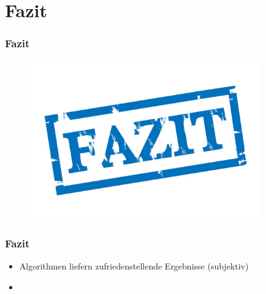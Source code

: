 \documentclass[12pt]{beamer}
\begin{document}
    \section{Fazit}
    \label{sec:fazit}
    \begin{frame}
        \frametitle{Fazit}

        \begin{figure}
            \centering
            \includegraphics[width=10cm]{../images/fazit.jpg}
        \end{figure}
    \end{frame}

    \begin{frame}
        \frametitle{Fazit}

        \begin{itemize}
            \setlength\itemsep{1em}
            \item Algorithmen liefern zufriedenstellende Ergebnisse (subjektiv)
            \item
        \end{itemize}
    \end{frame}
\end{document}
